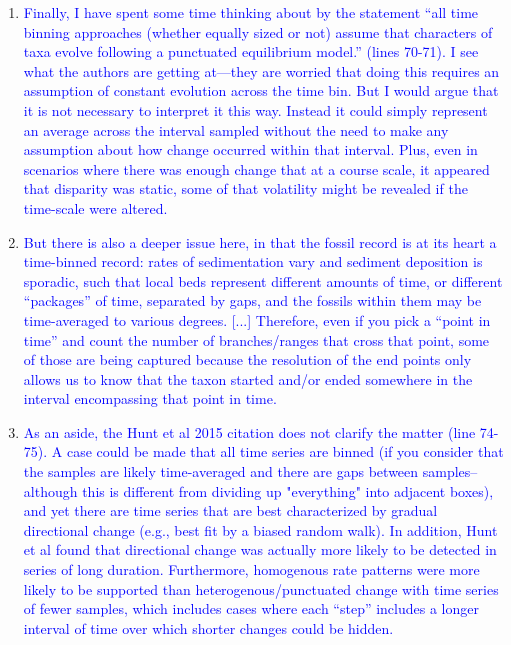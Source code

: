 \documentclass[12pt,letterpaper]{article}
\begin{document}
\begin{enumerate}
\item{\textcolor{blue}{Finally, I have spent some time thinking about by the statement ``all time binning approaches (whether equally sized or not) assume that characters of taxa evolve following a punctuated equilibrium model.'' (lines 70-71). I see what the authors are getting at—they are worried that doing this requires an assumption of constant evolution across the time bin. But I would argue that it is not necessary to interpret it this way. Instead it could simply represent an average across the interval sampled without the need to make any assumption about how change occurred within that interval. Plus, even in scenarios where there was enough change that at a course scale, it appeared that disparity was static, some of that volatility might be revealed if the time-scale were altered.}}



\item{\textcolor{blue}{But there is also a deeper issue here, in that the fossil record is at its heart a time-binned record: rates of sedimentation vary and sediment deposition is sporadic, such that local beds represent different amounts of time, or different ``packages'' of time, separated by gaps, and the fossils within them may be time-averaged to various degrees. [...] Therefore, even if you pick a ``point in time'' and count the number of branches/ranges that cross that point, some of those are being captured because the resolution of the end points only allows us to know that the taxon started and/or ended somewhere in the interval encompassing that point in time.}}




\item{\textcolor{blue}{As an aside, the Hunt et al 2015 citation does not clarify the matter (line 74-75). A case could be made that all time series are binned (if you consider that the samples are likely time-averaged and there are gaps between samples--although this is different from dividing up "everything" into adjacent boxes), and yet there are time series that are best characterized by gradual directional change (e.g., best fit by a biased random walk). In addition, Hunt et al found that directional change was actually more likely to be detected in series of long duration. Furthermore, homogenous rate patterns were more likely to be supported than heterogenous/punctuated change with time series of fewer samples, which includes cases where each ``step'' includes a longer interval of time over which shorter changes could be hidden.}}



\end{enumerate}
\end{document}
